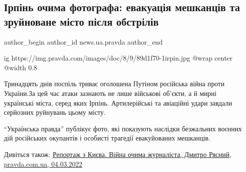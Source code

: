  
 
 
 
 
 
\subsection{Ірпінь очима фотографа: евакуація мешканців та зруйноване місто після обстрілів}
\label{sec:09_03_2022.stz.news.ua.pravda.1.irpen}
 
\ifcmt
 author_begin
   author_id news.ua.pravda
 author_end
\fi

\ifcmt
  ig https://img.pravda.com/images/doc/8/9/89d1f70-1irpin.jpg
  @wrap center
  @width 0.8
\fi

\begin{zznagolos}
Тринадцять днів поспіль триває оголошена Путіном російська війна проти
України.За цей час атаки зазнають не лише військові об'єкти, а й мирні
українські міста, серед яких Ірпінь. Артилерійські та авіаційні удари завдали
серйозних руйнувань цьому місту.

\enquote{Українська правда} публікує фото, які показують наслідки безжальних
воєнних дій російських окупантів і особисті трагедії евакуйованих мешканців.
\end{zznagolos}

Дивіться також: \href{https://www.pravda.com.ua/articles/2022/03/4/7328163/}{%
Репортаж з Києва. Війна очима журналіста, Дмитро Рясний, pravda.com.ua, 04.03.2022}









